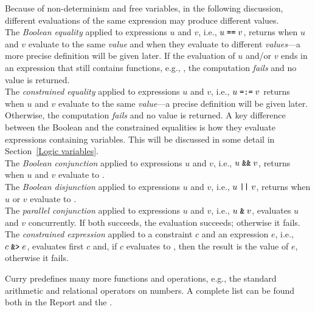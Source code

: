 \vspace{3ex}
\noindent
Because of non-determinism and free variables, in the following discussion,
different evaluations of the same expression may produce different values.
\\[1ex]
The \emph{Boolean equality}
applied to expressions $u$ and $v$, i.e.,
$u\;\mbox{\tt ==}\;v$, returns 
when $u$ and $v$ evaluate to the
same \emph{value} and  when they
evaluate to different \emph{values}---a
more precise definition will be given later. 
If the evaluation of $u$ and/or $v$ ends in an expression that
still contains functions, e.g., , the computation
\emph{fails} and no value is returned.
\\[1ex]
The \emph{constrained equality}%
applied to expressions $u$ and $v$, i.e.,
$u\;\mbox{\tt =:=}\;v$ returns 
when $u$ and $v$ evaluate to the
same \emph{value}---a precise definition will be given later. 
Otherwise, the computation \emph{fails} and no value is returned.
A key difference between the Boolean and the constrained equalities
is how they evaluate expressions containing variables.
This will be discussed in some detail in Section~\ref{Logic variables}.
\\[1ex]
The \emph{Boolean conjunction}%
applied to expressions $u$ and $v$, i.e.,
$u\;\mbox{\tt \&\&}\;v$, returns 
when $u$ and $v$ evaluate to .
\\[1ex]
The \emph{Boolean disjunction}%
applied to expressions $u$ and $v$, i.e.,
$u\;\mbox{\tt ||}\;v$, returns 
when $u$ or $v$ evaluate to .
\\[1ex]
The \emph{parallel conjunction}%
applied to expressions $u$ and $v$, i.e.,
$u\;\mbox{\tt \&}\;v$, evaluates $u$ and $v$ concurrently.
If both succeeds, the evaluation succeeds;
otherwise it fails.
\\[1ex]
The \emph{constrained expression}%
applied to a constraint $c$ and an expression $e$, i.e.,
$c\;\mbox{\tt \&>}\;e$, evaluates first $c$ and, if $c$ evaluates
to , then the result is the value of $e$, otherwise it fails.

Curry predefines many more functions and operations, e.g.,
the standard arithmetic and relational operators on numbers.
A complete list can be found both in the Report and the .

